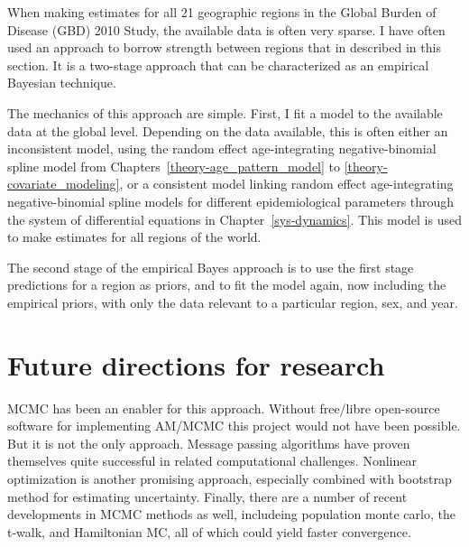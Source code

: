 When making estimates for all 21 geographic regions in the Global
Burden of Disease (GBD) 2010 Study, the available data is often very
sparse.  I have often used an approach to borrow strength between
regions that in described in this section.  It is a two-stage approach
that can be characterized as an empirical Bayesian technique.

The mechanics of this approach are simple.  First, I fit a model to
the available data at the global level.  Depending on the data
available, this is often either an inconsistent model, using the
random effect age-integrating negative-binomial spline model from
Chapters~\ref{theory-age_pattern_model} to
\ref{theory-covariate_modeling}, or a consistent model linking random
effect age-integrating negative-binomial spline models for different
epidemiological parameters through the system of differential
equations in Chapter~\ref{sys-dynamics}.  This model is used to make
estimates for all regions of the world.

The second stage of the empirical Bayes approach is to use the first
stage predictions for a region as priors, and to fit the model again,
now including the empirical priors, with only the data relevant to a
particular region, sex, and year.


\section{Future directions for research}

MCMC has been an enabler for this approach.  Without free/libre
open-source software for implementing AM/MCMC this project would not
have been possible.  But it is not the only approach.  Message passing
algorithms have proven themselves quite successful in related
computational challenges.\cite{TK} Nonlinear optimization is another
promising approach, especially combined with bootstrap method for
estimating uncertainty.\cite{dm4_paper} Finally, there are a number of
recent developments in MCMC methods as well, includeing population
monte carlo, the t-walk, and Hamiltonian MC, all of which could yield
faster convergence.\cite{several_papers_on_this}


